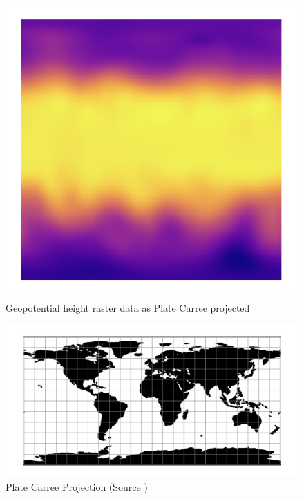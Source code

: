 \begin{figure}[H]
    \centering
    \begin{minipage}{0.30\textwidth}
        \centering
        \includegraphics[width=0.9\linewidth]{figures/chapter-8/plate_caree_geopoth_raster.png}
        \caption{ Geopotential height raster data as Plate Carree projected}
        \label{fig:pc_geopoth_raster}
    \end{minipage}\hfill
    \begin{minipage}{0.30\textwidth}
        \centering
        \includegraphics[width=0.9\linewidth]{figures/chapter-8/eqc.png}
        \caption{Plate Carree Projection (Source \cite{PROJ_SITE})}
        \label{fig:pc_proj}
    \end{minipage}\hfill
    \begin{minipage}{0.30\textwidth}
        \centering

\end{minipage}
\end{figure}
